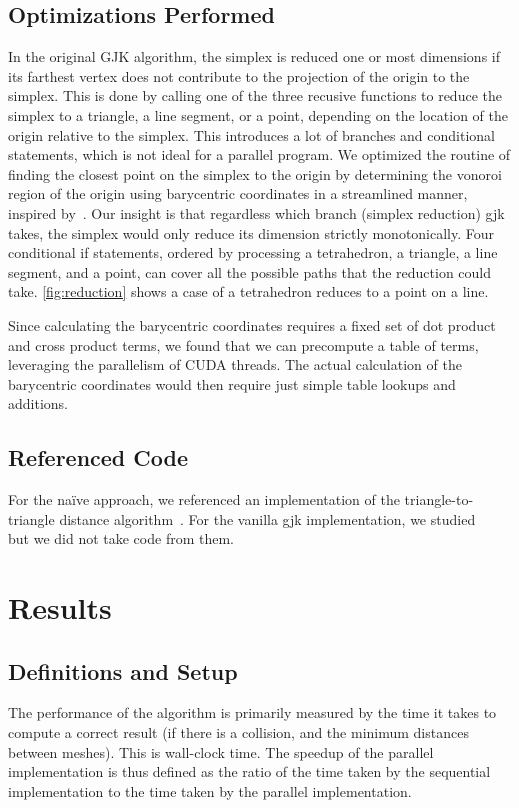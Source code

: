 \documentclass[12pt,fleqn]{article}
\begin{document}
\subsection{Optimizations Performed}
In the original GJK algorithm, the simplex is reduced one or most dimensions if its farthest vertex does not contribute to the projection of the origin to the simplex. This is done by calling one of the three recusive functions to reduce the simplex to a triangle, a line segment, or a point, depending on the location of the origin relative to the simplex. This introduces a lot of branches and conditional statements, which is not ideal for a parallel program. We optimized the routine of finding the closest point on the simplex to the origin by determining the vonoroi region of the origin using barycentric coordinates in a streamlined manner, inspired by~\cite{zhang2020barycode}. Our insight is that regardless which branch (simplex reduction) gjk takes, the simplex would only reduce its dimension strictly monotonically. Four conditional if statements, ordered by processing a tetrahedron, a triangle, a line segment, and a point, can cover all the possible paths that the reduction could take. \ref{fig:reduction} shows a case of a tetrahedron reduces to a point on a line.

Since calculating the barycentric coordinates requires a fixed set of dot product and cross product terms, we found that we can precompute a table of terms, leveraging the parallelism of CUDA threads. The actual calculation of the barycentric coordinates would then require just simple table lookups and additions.

\subsection{Referenced Code}
For the naïve approach, we referenced an implementation of the triangle-to-triangle distance algorithm~\cite{larsen}.
For the vanilla gjk implementation, we studied ~\cite{cameron} but we did not take code from them.



\section{Results}

\subsection{Definitions and Setup}
The performance of the algorithm is primarily measured by the time it takes to compute a correct result (if there is a collision, and the minimum distances between meshes).
This is wall-clock time.
The speedup of the parallel implementation is thus defined as the ratio of the time taken by the sequential implementation to the time taken by the parallel implementation.
\end{document}
